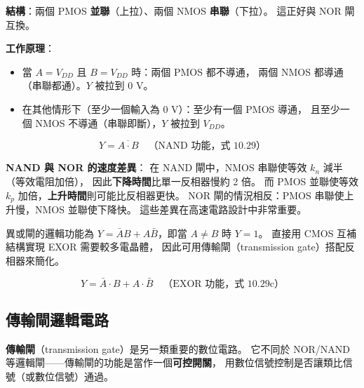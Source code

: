 \documentclass[12pt]{article}
\begin{document}
\begin{keybox}


\textbf{結構}：兩個 PMOS \textbf{並聯}（上拉）、兩個 NMOS \textbf{串聯}（下拉）。
這正好與 NOR 閘互換。

\textbf{工作原理}：
\begin{itemize}[leftmargin=2.2em,itemsep=1pt]
  \item 當 $A = V_{DD}$ 且 $B = V_{DD}$ 時：兩個 PMOS 都不導通，
    兩個 NMOS 都導通（串聯都通）。$Y$ 被拉到 0 V。
  \item 在其他情形下（至少一個輸入為 0 V）：至少有一個 PMOS 導通，
    且至少一個 NMOS 不導通（串聯即斷），$Y$ 被拉到 $V_{DD}$。
\end{itemize}

\begin{formulabox}
\[
  Y = \overline{A \cdot B} \quad\text{（NAND 功能，式 10.29）}
\]
\end{formulabox}
\end{keybox}

\textbf{NAND 與 NOR 的速度差異}：
在 NAND 閘中，NMOS 串聯使等效 $k_n$ 減半（等效電阻加倍），
因此\textbf{下降時間}比單一反相器慢約 2 倍。
而 PMOS 並聯使等效 $k_p$ 加倍，\textbf{上升時間}則可能比反相器更快。
NOR 閘的情況相反：PMOS 串聯使上升慢，NMOS 並聯使下降快。
這些差異在高速電路設計中非常重要。

\begin{keybox}
異或閘的邏輯功能為 $Y = \bar{A}B + A\bar{B}$，即當 $A \neq B$ 時 $Y = 1$。
直接用 CMOS 互補結構實現 EXOR 需要較多電晶體，
因此可用傳輸閘（transmission gate）搭配反相器來簡化。

\begin{formulabox}
\[
  Y = \bar{A} \cdot B + A \cdot \bar{B} \quad\text{（EXOR 功能，式 10.29c）}
\]
\end{formulabox}
\end{keybox}

\subsection*{傳輸閘邏輯電路}


\textbf{傳輸閘}（transmission gate）是另一類重要的數位電路。
它不同於 NOR/NAND 等邏輯閘——傳輸閘的功能是當作一個\textbf{可控開關}，
用數位信號控制是否讓類比信號（或數位信號）通過。
\end{document}
